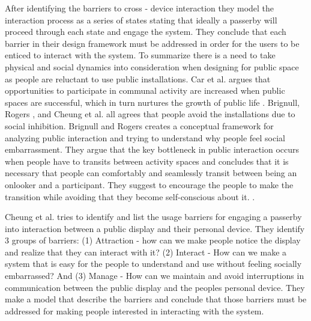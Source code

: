 After identifying the barriers to cross - device interaction  they model the interaction process as a series of states  stating that ideally a passerby will proceed through each state and engage the system. They conclude that each barrier in their design framework must be addressed in order for the users to be enticed to interact with the system.
To summarize there is a need to take physical and social dynamics into consideration when designing for public space as people are reluctant to use public installations. Car et al. argues that opportunities to participate in communal activity are increased when public spaces are successful, which in turn nurtures the growth of public life \protect\cite{carr:1992}. Brignull, Rogers \protect\cite{Brignull:2003}, and Cheung et al. \protect\cite{Cheung:2014} all agrees that people avoid the installations due to social inhibition. Brignull and Rogers creates a conceptual framework for analyzing public interaction and trying to understand why people feel social embarrassment. They argue that the key bottleneck in public interaction occurs when people have to transits between activity spaces and concludes that it is necessary that people can comfortably and seamlessly transit between being an onlooker and a participant. They suggest to encourage the people to make the transition while avoiding that they become self-conscious about it. .

Cheung et al. tries to identify and list the usage barriers for engaging a passerby into interaction between a public display and their personal device. They identify 3 groups of barriers: (1) Attraction - how can we make people notice the display and realize that they can interact with it? (2) Interact - How can we make a system that is easy for the people to understand and use without feeling socially embarrassed? And (3) Manage - How can we maintain and avoid interruptions in communication between the public display and the peoples personal device.
They make a model that describe the barriers and conclude that those barriers must be addressed for making people interested in interacting with the system.

